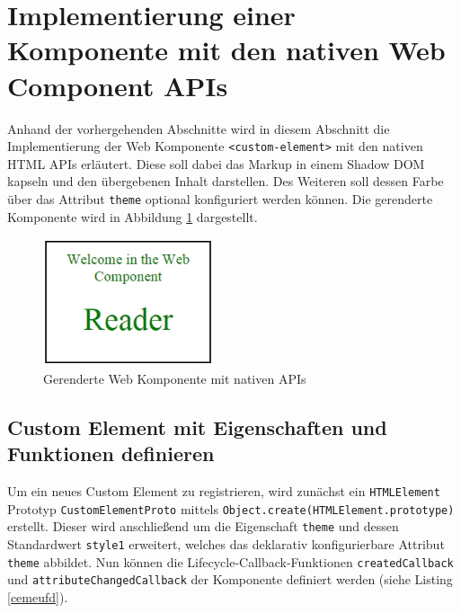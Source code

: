 \section{Implementierung einer Komponente mit den nativen Web Component APIs}\label{implementierung-einer-komponente-mit-den-nativen-web-component-apis}

Anhand der vorhergehenden Abschnitte wird in diesem Abschnitt die Implementierung der Web Komponente \texttt{\textless{}custom-element\textgreater{}} mit den nativen \ac{HTML} APIs erläutert. Diese soll dabei das Markup in einem Shadow \ac{DOM} kapseln und den übergebenen Inhalt darstellen. Des Weiteren soll dessen Farbe über das Attribut \texttt{theme} optional konfiguriert werden können. Die gerenderte Komponente wird in Abbildung \ref{fig:gwkmnapis} dargestellt.

\begin{figure}[htbp]
 \centering
 \includegraphics[width=5cm,keepaspectratio]{kapitel2/bilder/7-beispiel}
 \caption{Gerenderte Web Komponente mit nativen APIs}
 \label{fig:gwkmnapis}
\end{figure}


\subsection{Custom Element mit Eigenschaften und Funktionen definieren}\label{custom-element-mit-eigenschaften-und-funktionen-definieren}

Um ein neues Custom Element zu registrieren, wird zunächst ein \texttt{\ac{HTML}Element} Prototyp \texttt{CustomElementProto} mittels \texttt{Object.create(\ac{HTML}Element.prototype)} erstellt. Dieser wird anschließend um die Eigenschaft \texttt{theme} und dessen Standardwert \texttt{style1} erweitert, welches das deklarativ konfigurierbare
Attribut \texttt{theme} abbildet. Nun können die Lifecycle-Callback-Funktionen \texttt{createdCallback} und \texttt{attributeChangedCallback} der Komponente definiert werden (siehe Listing \ref{cemeufd}).



